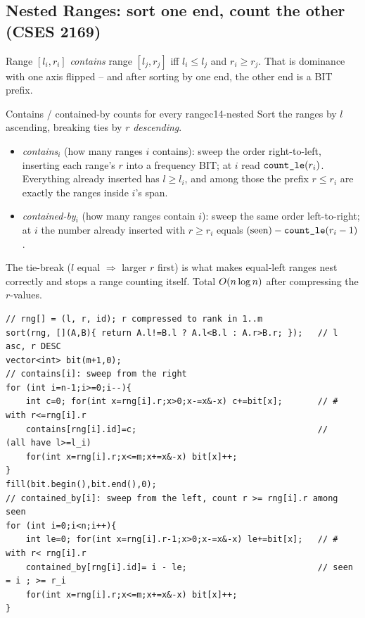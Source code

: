 \subsection{Nested Ranges: sort one end, count the other (CSES 2169)}

Range \([l_i,r_i]\) \emph{contains} range \([l_j,r_j]\) iff \(l_i\le l_j\) and
\(r_i\ge r_j\).  That is dominance with one axis flipped -- and after sorting by
one end, the other end is a BIT prefix.

\begin{proposition}{Contains / contained-by counts for every range}{c14-nested}
Sort the ranges by \(l\) ascending, breaking ties by \(r\) \emph{descending}.
\begin{itemize}[nosep,leftmargin=1.4em]
  \item \emph{contains\(_i\)} (how many ranges \(i\) contains): sweep the order
        right-to-left, inserting each range's \(r\) into a frequency BIT; at
        \(i\) read \(\texttt{count\_le}(r_i)\).  Everything already inserted has
        \(l\ge l_i\), and among those the prefix \(r\le r_i\) are exactly the
        ranges inside \(i\)'s span.
  \item \emph{contained-by\(_i\)} (how many ranges contain \(i\)): sweep the
        same order left-to-right; at \(i\) the number already inserted with
        \(r\ge r_i\) equals \((\text{seen})-\texttt{count\_le}(r_i-1)\).
\end{itemize}
The tie-break (\(l\) equal \(\Rightarrow\) larger \(r\) first) is what makes
equal-left ranges nest correctly and stops a range counting itself.  Total
\(O(n\log n)\) after compressing the \(r\)-values.
\end{proposition}

\begin{lstlisting}[caption={Nested Ranges Count (CSES 2169): sort left ends, BIT over right ends}, label={lst:c14-nested}]
// rng[] = (l, r, id); r compressed to rank in 1..m
sort(rng, [](A,B){ return A.l!=B.l ? A.l<B.l : A.r>B.r; });   // l asc, r DESC
vector<int> bit(m+1,0);
// contains[i]: sweep from the right
for (int i=n-1;i>=0;i--){
    int c=0; for(int x=rng[i].r;x>0;x-=x&-x) c+=bit[x];       // # with r<=rng[i].r
    contains[rng[i].id]=c;                                    //   (all have l>=l_i)
    for(int x=rng[i].r;x<=m;x+=x&-x) bit[x]++;
}
fill(bit.begin(),bit.end(),0);
// contained_by[i]: sweep from the left, count r >= rng[i].r among seen
for (int i=0;i<n;i++){
    int le=0; for(int x=rng[i].r-1;x>0;x-=x&-x) le+=bit[x];   // # with r< rng[i].r
    contained_by[rng[i].id]= i - le;                          // seen = i ; >= r_i
    for(int x=rng[i].r;x<=m;x+=x&-x) bit[x]++;
}
\end{lstlisting}

